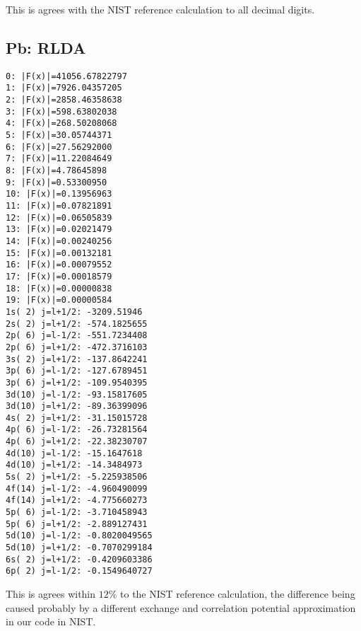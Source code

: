 This is agrees with the NIST reference calculation to all decimal digits.

\subsection{Pb: RLDA}

\begin{lstlisting}
0: |F(x)|=41056.67822797
1: |F(x)|=7926.04357205
2: |F(x)|=2858.46358638
3: |F(x)|=598.63802038
4: |F(x)|=268.50208068
5: |F(x)|=30.05744371
6: |F(x)|=27.56292000
7: |F(x)|=11.22084649
8: |F(x)|=4.78645898
9: |F(x)|=0.53300950
10: |F(x)|=0.13956963
11: |F(x)|=0.07821891
12: |F(x)|=0.06505839
13: |F(x)|=0.02021479
14: |F(x)|=0.00240256
15: |F(x)|=0.00132181
16: |F(x)|=0.00079552
17: |F(x)|=0.00018579
18: |F(x)|=0.00000838
19: |F(x)|=0.00000584
1s( 2) j=l+1/2: -3209.51946
2s( 2) j=l+1/2: -574.1825655
2p( 6) j=l-1/2: -551.7234408
2p( 6) j=l+1/2: -472.3716103
3s( 2) j=l+1/2: -137.8642241
3p( 6) j=l-1/2: -127.6789451
3p( 6) j=l+1/2: -109.9540395
3d(10) j=l-1/2: -93.15817605
3d(10) j=l+1/2: -89.36399096
4s( 2) j=l+1/2: -31.15015728
4p( 6) j=l-1/2: -26.73281564
4p( 6) j=l+1/2: -22.38230707
4d(10) j=l-1/2: -15.1647618
4d(10) j=l+1/2: -14.3484973
5s( 2) j=l+1/2: -5.225938506
4f(14) j=l-1/2: -4.960490099
4f(14) j=l+1/2: -4.775660273
5p( 6) j=l-1/2: -3.710458943
5p( 6) j=l+1/2: -2.889127431
5d(10) j=l-1/2: -0.8020049565
5d(10) j=l+1/2: -0.7070299184
6s( 2) j=l+1/2: -0.4209603386
6p( 2) j=l-1/2: -0.1549640727
\end{lstlisting}

This is agrees within $12\%$ to the NIST reference calculation, the difference
being caused probably by a different exchange and correlation potential
approximation in our code in NIST.
